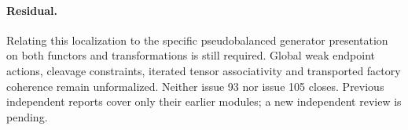 \documentclass{article}
\begin{document}
\paragraph{Residual.} Relating this localization to the specific pseudobalanced generator presentation on both functors and transformations is still required. Global weak endpoint actions, cleavage constraints, iterated tensor associativity and transported factory coherence remain unformalized. Neither issue 93 nor issue 105 closes. Previous independent reports cover only their earlier modules; a new independent review is pending.
\end{document}

